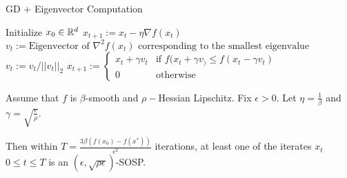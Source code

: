 \begin{algorithm}
    \centering
        \caption{GD + Eigenvector Computation}
        \begin{algorithmic}[1]
            \STATE Initialize $x_0 \in \mathbb{R}^d$
                \STATE $x_{t+1} := x_t - \eta \nabla f(x_t)$
                \ELSE
                \STATE $v_t := \text{Eigenvector of $\nabla^2 f(x_t)$ corresponding to the smallest eigenvalue}$
                \STATE $v_t := v_t/||v_t||_2$
                \STATE $x_{t+1} := \begin{cases}
                            x_t + \gamma v_t & \text{if } f(x_t + \gamma v_) \leq f(x_t - \gamma v_t)\\
                            0 & \text{otherwise}
                                    \end{cases}$
                \ENDIF
            \ENDFOR
        \end{algorithmic}
\end{algorithm}


\begin{theorem}
    Assume that \(f\) is \(\beta\)-smooth and \(\rho-\)Hessian Lipschitz. Fix \(\epsilon > 0\). Let \(\eta = \frac{1}{\beta}\) and \(\gamma = \sqrt{\frac{\epsilon}{\rho}}\). 

    Then within \(T = \frac{3 \beta \left( f(x_0) - f(x^*)\right)}{\epsilon^2}\) iterations, at least one of the iterates \(x_t\) \(0 \leq t \leq T\) is an \((\epsilon, \sqrt{\rho \epsilon})\)-SOSP.
\end{theorem}

